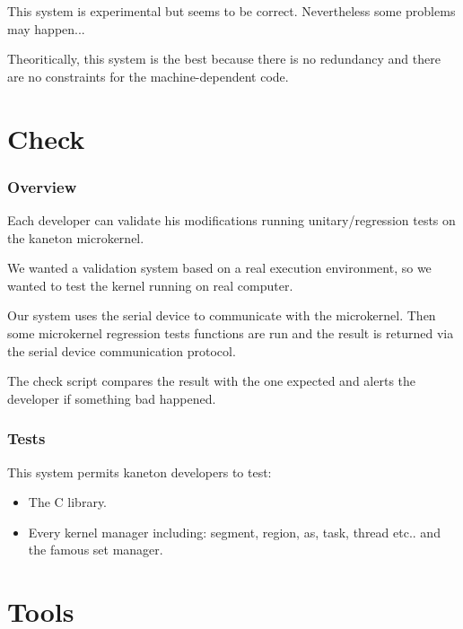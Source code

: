 {\begin{frame}
  \nl

  This system is experimental but seems to be correct. Nevertheless some
  problems may happen...

  \nl

  Theoritically, this system is the best because there is no redundancy
  and there are no constraints for the machine-dependent code.
\end{frame}

%
%

\section{Check}


\begin{frame}
  \frametitle{Overview}

  Each  developer can validate his modifications running unitary/regression
  tests on the kaneton microkernel.

  \nl

  We wanted a validation system based on a real execution environment,
  so we wanted to test the kernel running on real computer.

  \nl

  Our system uses the serial device to communicate with the microkernel. Then
  some microkernel regression tests functions are run and the result
  is returned via the serial device communication protocol.

  \nl

  The check script compares the result with the one expected and alerts
  the developer if something bad happened.
\end{frame}


\begin{frame}
  \frametitle{Tests}

  This system permits kaneton developers to test:

  \begin{itemize}[<+->]
    \item
      The C library.
    \item
      Every kernel manager including: segment, region, as, task, thread
      etc.. and the famous set manager.
  \end{itemize}
\end{frame}

%
%

\section{Tools}

}
